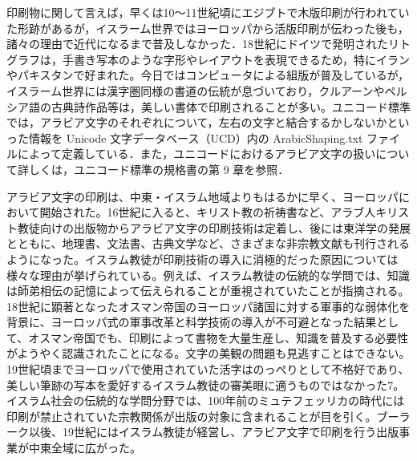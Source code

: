 印刷物に関して言えば，早くは10〜11世紀頃にエジブトで木版印刷が行われていた形跡があるが，イスラーム世界ではヨーロッパから活版印刷が伝わった後も，諸々の理由で近代になるまで普及しなかった．18世紀にドイツで発明されたリトグラフは，手書き写本のような字形やレイアウトを表現できるため，特にイランやパキスタンで好まれた。今日ではコンピュータによる組版が普及しているが，イスラーム世界には漢字圏同様の書道の伝統が息づいており，クルアーンやペルシア語の古典詩作品等は，美しい書体で印刷されることが多い。ユニコード標準では，アラビア文字のそれぞれについて，左右の文字と結合するかしないかといった情報を Unicode 文字データベース（UCD）内の ArabicShaping.txt ファイルによって定義している．また，ユニコードにおけるアラビア文字の扱いについて詳しくは，ユニコード標準の規格書の第 9 章を参照\cite{islamic_area_studies_resources}．

アラビア文字の印刷は、中東・イスラム地域よりもはるかに早く、ヨーロッパにおいて開始された。16世紀に入ると、キリスト教の祈祷書など、アラブ人キリスト教徒向けの出版物からアラビア文字の印刷技術は定着し、後には東洋学の発展とともに、地理書、文法書、古典文学など、さまざまな非宗教文献も刊行されるようになった。イスラム教徒が印刷技術の導入に消極的だった原因については様々な理由が挙げられている。例えば、イスラム教徒の伝統的な学問では、知識は師弟相伝の記憶によって伝えられることが重視されていたことが指摘される。18世紀に顕著となったオスマン帝国のヨーロッパ諸国に対する軍事的な弱体化を背景に、ヨーロッパ式の軍事改革と科学技術の導入が不可避となった結果として、オスマン帝国でも、印刷によって書物を大量生産し、知識を普及する必要性がようやく認識されたことになる。文字の美観の問題も見逃すことはできない。19世紀頃までヨーロッパで使用されていた活字はのっぺりとして不格好であり、美しい筆跡の写本を愛好するイスラム教徒の審美眼に適うものではなかった7。イスラム社会の伝統的な学問分野では、100年前のミュテフェッリカの時代には印刷が禁止されていた宗教関係が出版の対象に含まれることが目を引く。ブーラーク以後、19世紀にはイスラム教徒が経営し、アラビア文字で印刷を行う出版事業が中東全域に広がった\cite{rnavi.ndl.go.jp:asia/entry/bulletin7-3-2.php}。
